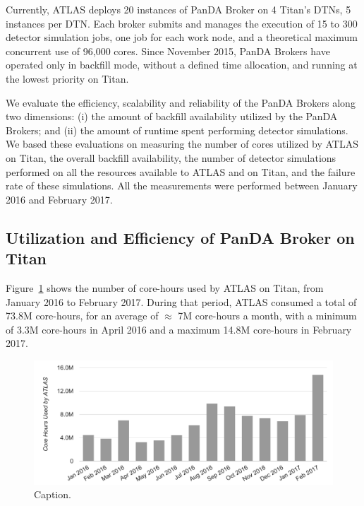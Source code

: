 Currently, ATLAS deploys 20 instances of PanDA Broker on 4 Titan's DTNs, 5
instances per DTN. Each broker submits and manages the execution of 15 to 300
detector simulation jobs, one job for each work node, and a theoretical maximum
concurrent use of 96,000 cores. Since November 2015, PanDA Brokers have operated
only in backfill mode, without a defined time allocation, and running at the
lowest priority on Titan.

We evaluate the efficiency, scalability and reliability of the PanDA Brokers
along two dimensions: (i) the amount of backfill availability utilized by the
PanDA Brokers; and (ii) the amount of 
runtime spent performing detector simulations. We based these evaluations on measuring the number
of cores utilized by ATLAS on Titan, the overall backfill availability, the
number of detector simulations performed on all the resources available to ATLAS
and on Titan, and the failure rate of these simulations. All the measurements
were performed between January 2016 and February 2017.

\subsection{Utilization and Efficiency of PanDA Broker on Titan}
\label{ssec:panda_titan}

Figure~\ref{fig:core-hours-utilization} shows the number of core-hours used by
ATLAS on Titan, from January 2016 to February 2017. During that period, ATLAS
consumed a total of 73.8M core-hours, for an average of $\approx$ 7M core-hours a month,
with a minimum of 3.3M core-hours in April 2016 and a maximum 14.8M core-hours
in February 2017.

%

\begin{figure}[htp]
\includegraphics[clip,width=\columnwidth]{figures/cpu_hours.png}
\caption{Caption.}
\label{fig:core-hours-utilization}
\end{figure}

